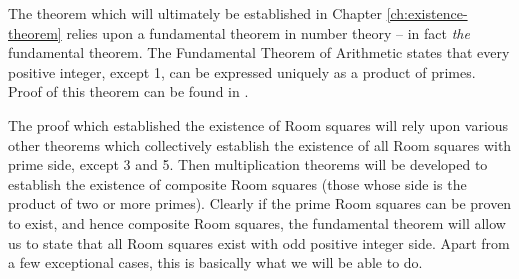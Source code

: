 The theorem which will ultimately be established in Chapter \ref{ch:existence-theorem} relies upon a fundamental theorem in number theory – in fact \emph{the} fundamental theorem.
The Fundamental Theorem of Arithmetic states that every positive integer, except 1, can be expressed uniquely as a product of primes.
Proof of this theorem can be found in
\cite{hardyIntroductionTheoryNumbers1979}.

The proof which established the existence of Room squares will rely upon various other theorems which collectively establish the existence of all Room squares with prime side, except 3 and 5.
Then multiplication theorems will be developed to establish the existence of composite Room squares (those whose side is the product of two or more primes).
Clearly if the prime Room squares can be proven to exist, and hence composite Room squares, the fundamental theorem will allow us to state that all Room squares exist with odd positive integer side.
Apart from a few exceptional cases, this is basically what we will be able to do.
